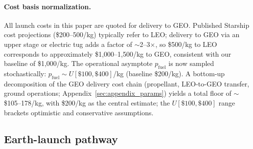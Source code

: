 \documentclass[5p,twocolumn]{elsarticle}
\begin{document}
\paragraph{Cost basis normalization.} All launch costs in this paper are quoted for delivery to GEO. Published Starship cost projections (\$200--500/kg) typically refer to LEO; delivery to GEO via an upper stage or electric tug adds a factor of $\sim$2--3$\times$, so \$500/kg to LEO corresponds to approximately \$1,000--1,500/kg to GEO, consistent with our baseline of \$1,000/kg. The operational asymptote $p_{\mathrm{fuel}}$ is now sampled stochastically: $p_{\mathrm{fuel}} \sim U[\$100, \$400]$/kg (baseline \$200/kg). A bottom-up decomposition of the GEO delivery cost chain (propellant, LEO-to-GEO transfer, ground operations; Appendix~\ref{sec:appendix_params}) yields a total floor of $\sim$\$105--178/kg, with \$200/kg as the central estimate; the $U[\$100, \$400]$ range brackets optimistic and conservative assumptions.

\subsection{Earth-launch pathway}
\end{document}
